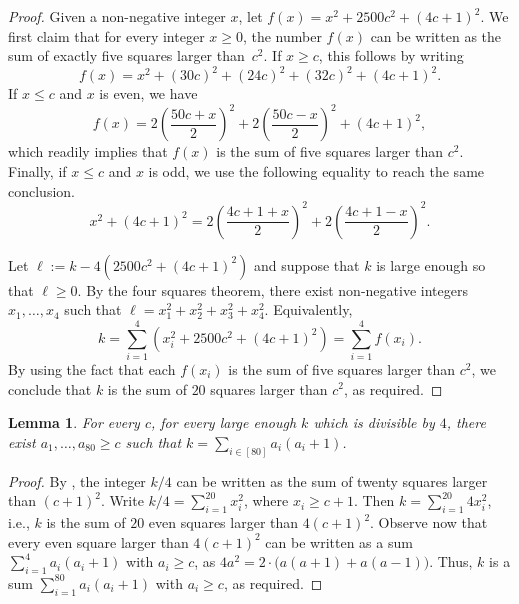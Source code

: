 \documentclass[11pt,english]{article}
\theoremstyle{plain}
\newtheorem{lem}[thm]{Lemma}
\theoremstyle{definition}
\theoremstyle{remark}
\begin{document}
	\begin{proof}
	    Given a non-negative integer $x$, let $f(x)= x^2 + 2500c^2 + (4c+1)^2$. We first claim that for every integer $x\geq 0$, the number $f(x)$ can be written as the sum of exactly five squares larger than~$c^2$. If $x \ge c$, this follows by writing
	    \begin{equation*}
	        f(x) = x^2 + (30c)^2 + (24c)^2 + (32c)^2 + (4c+1)^2.
	    \end{equation*}
	    If $x \le c$ and $x$ is even, we have
	    \begin{equation*}
	        f(x) = 2\left(\frac{50c + x}{2}\right)^2 + 2\left(\frac{50c - x}{2}\right)^2+(4c+1)^2,
	    \end{equation*}
	    which readily implies that $f(x)$ is the sum of five squares larger than $c^2$. 
	    Finally, if $x \le c$ and $x$ is odd, we use the following equality to reach the same conclusion.
	    \begin{equation*}
	        x^2 + (4c + 1)^2 
	        = 2\left(\frac{4c + 1 + x}{2}\right)^2 + 2\left(\frac{4c + 1 - x}{2}\right)^2.
	    \end{equation*}

        Let $\ell := k - 4 \left( 2500c^2 + (4c+1)^2 \right)$ and suppose that $k$ is large enough so that $\ell \ge 0$.
		By the four squares theorem, there exist non-negative integers $x_1, \ldots, x_4$ such that $\ell = x_1^2 + x_2^2+x_3^2 + x_4^2$. Equivalently,
		\begin{equation*}
			k = \sum_{i =1}^4 \left(x_i^2 + 2500c^2 + (4c+1)^2\right) = \sum_{i =1}^4 f(x_i).
		\end{equation*}
		By using the fact that each $f(x_i)$ is the sum of five squares larger than $c^2$, we conclude that $k$ is the sum of $20$ squares larger than $c^2$, as required.
	\end{proof}

	\begin{lem} \label{lem:sum-skewed-squares}
		For every $c$, for every large enough $k$ which is divisible by $4$, there exist $a_1, \ldots, a_{80} \ge c$ such that $k = \sum_{i \in [80]} a_i(a_i + 1)$. 
	\end{lem}

	\begin{proof}
		By , the integer $k/4$ can be written as the sum of twenty squares larger than $(c+1)^2$. Write $k/4 = \sum_{i =1}^{20} x_i^2$, where $x_i \ge c+1$. Then $k = \sum_{i=1}^{20} 4x_i^2$, i.e., $k$ is the sum of $20$ even squares larger than $4(c+1)^2$. 
		Observe now that every even square larger than $4(c+1)^2$ can be written as a sum $\sum_{i=1}^4 a_i (a_i + 1)$ with $a_i \ge c$, as $4a^2 = 2 \cdot \big( a(a+1) + a(a-1) \big)$.
		Thus, $k$ is a sum $\sum_{i=1}^{80} a_i(a_i + 1)$ with $a_i \ge c$, as required.
	\end{proof}
\end{document}
